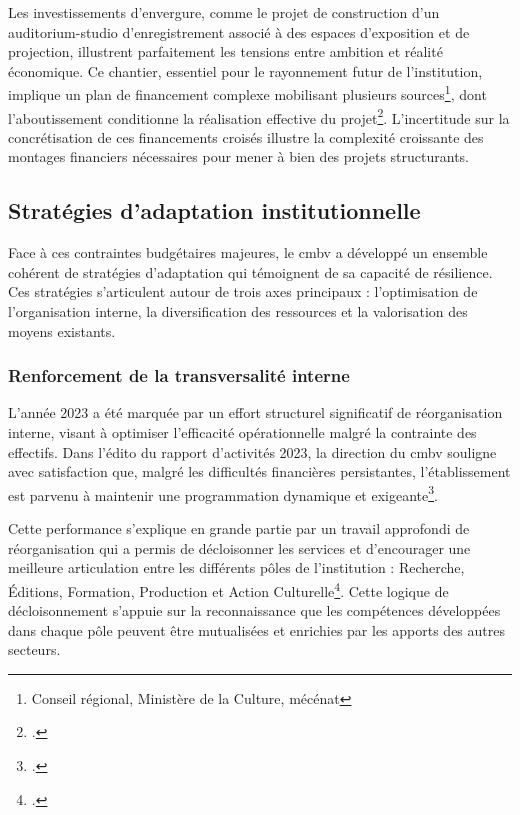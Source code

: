 Les investissements d'envergure, comme le projet de construction d'un auditorium-studio d'enregistrement associé à des espaces d'exposition et de projection, illustrent parfaitement les tensions entre ambition et réalité économique. Ce chantier, essentiel pour le rayonnement futur de l'institution, implique un plan de financement complexe mobilisant plusieurs sources\footnote{Conseil régional, Ministère de la Culture, mécénat}, dont l'aboutissement conditionne la réalisation effective du projet\footcite{centredemusiquebaroquedeversaillesProjetEtablissement2022}. L'incertitude sur la concrétisation de ces financements croisés illustre la complexité croissante des montages financiers nécessaires pour mener à bien des projets structurants.

\subsection{Stratégies d'adaptation institutionnelle}

Face à ces contraintes budgétaires majeures, le \gls{cmbv} a développé un ensemble cohérent de stratégies d'adaptation qui témoignent de sa capacité de résilience. Ces stratégies s'articulent autour de trois axes principaux : l'optimisation de l'organisation interne, la diversification des ressources et la valorisation des moyens existants.

\subsubsection{Renforcement de la transversalité interne}

L'année 2023 a été marquée par un effort structurel significatif de réorganisation interne, visant à optimiser l'efficacité opérationnelle malgré la contrainte des effectifs. Dans l'édito du rapport d'activités 2023, la direction du \gls{cmbv} souligne avec satisfaction que, malgré les difficultés financières persistantes, l'établissement est parvenu à maintenir une programmation dynamique et exigeante\footcite{centredemusiquebaroquedeversaillesRapportActivite2023}.

Cette performance s'explique en grande partie par un travail approfondi de réorganisation qui a permis de décloisonner les services et d'encourager une meilleure articulation entre les différents pôles de l'institution : Recherche, Éditions, Formation, Production et Action Culturelle\footcite{centredemusiquebaroquedeversaillesRapportActivite2023}. Cette logique de décloisonnement s'appuie sur la reconnaissance que les compétences développées dans chaque pôle peuvent être mutualisées et enrichies par les apports des autres secteurs.

